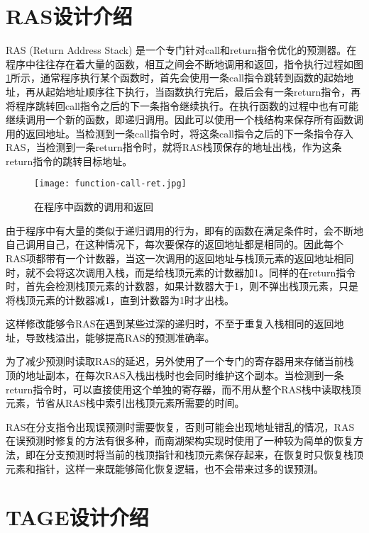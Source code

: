 \section{RAS设计介绍}

RAS (Return Address Stack) 是一个专门针对call和return指令优化的预测器。在程序中往往存在着大量的函数，相互之间会不断地调用和返回，指令执行过程如图\ref{fig:figure22}所示，通常程序执行某个函数时，首先会使用一条call指令跳转到函数的起始地址，再从起始地址顺序往下执行，当函数执行完后，最后会有一条return指令，再将程序跳转回call指令之后的下一条指令继续执行。在执行函数的过程中也有可能继续调用一个新的函数，即递归调用。因此可以使用一个栈结构来保存所有函数调用的返回地址。当检测到一条call指令时，将这条call指令之后的下一条指令存入RAS，当检测到一条return指令时，就将RAS栈顶保存的地址出栈，作为这条return指令的跳转目标地址。

\begin{figure}[htb]
	\centering
	\setlength\tabcolsep{3pt}  %
	\vspace{5pt} %
	\texttt{[image: function-call-ret.jpg]}
	\caption{在程序中函数的调用和返回}
	\label{fig:figure22}
\end{figure}

由于程序中有大量的类似于递归调用的行为，即有的函数在满足条件时，会不断地自己调用自己，在这种情况下，每次要保存的返回地址都是相同的。因此每个RAS项都带有一个计数器，当这一次调用的返回地址与栈顶元素的返回地址相同时，就不会将这次调用入栈，而是给栈顶元素的计数器加1。同样的在return指令时，首先会检测栈顶元素的计数器，如果计数器大于1，则不弹出栈顶元素，只是将栈顶元素的计数器减1，直到计数器为1时才出栈。

这样修改能够令RAS在遇到某些过深的递归时，不至于重复入栈相同的返回地址，导致栈溢出，能够提高RAS的预测准确率。

为了减少预测时读取RAS的延迟，另外使用了一个专门的寄存器用来存储当前栈顶的地址副本，在每次RAS入栈出栈时也会同时维护这个副本。当检测到一条return指令时，可以直接使用这个单独的寄存器，而不用从整个RAS栈中读取栈顶元素，节省从RAS栈中索引出栈顶元素所需要的时间。

RAS在分支指令出现误预测时需要恢复，否则可能会出现地址错乱的情况，RAS在误预测时修复的方法有很多种\cite{ras-recovey, ras-revisited}，而南湖架构实现时使用了一种较为简单的恢复方法，即在分支预测时将当前的栈顶指针和栈顶元素保存起来，在恢复时只恢复栈顶元素和指针，这样一来既能够简化恢复逻辑，也不会带来过多的误预测。

\section{TAGE设计介绍}

